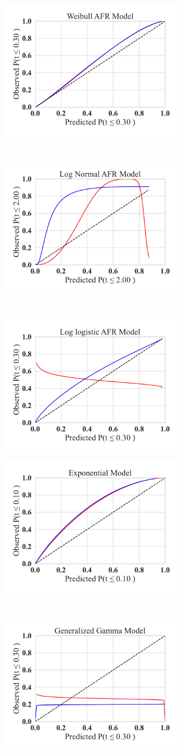 \begin{figure}
	\centering
	\begin{subfigure}
		\centering
		\includegraphics[width=.30\textwidth,trim={20pt 20pt 20pt 20pt},clip]{plots/weibull_qq.pdf}
	\end{subfigure}%
	~
	\begin{subfigure}
		\centering
		\includegraphics[width=.30\textwidth,trim={20pt 20pt 20pt 20pt},clip]{plots/log_normal_qq.pdf}
	\end{subfigure}
	~
	\begin{subfigure}
		\centering
		\includegraphics[width=.30\textwidth,trim={20pt 20pt 20pt 20pt},clip]{plots/log_logistic_qq.pdf}
	\end{subfigure}
 \begin{subfigure}
		\centering
		\includegraphics[width=.30\textwidth,trim={20pt 20pt 20pt 20pt},clip]{plots/exponential_qq.pdf}
	\end{subfigure}%
	~
	\begin{subfigure}
		\centering
		\includegraphics[width=.30\textwidth,trim={20pt 20pt 20pt 20pt},clip]{plots/gamma_qq.pdf}

\end{subfigure}
\end{figure}
